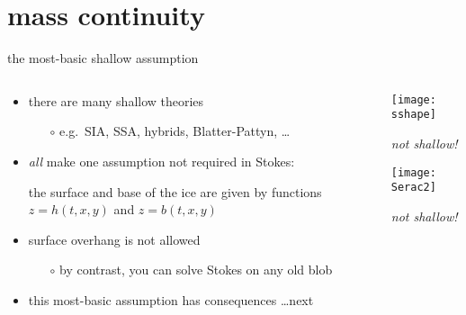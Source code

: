 
\section{mass continuity}

\begin{frame}{the most-basic shallow assumption}

\begin{columns}

\begin{column}{0.6\textwidth}
\begin{itemize}
\item there are many shallow theories
  \begin{itemize}
  \item[$\circ$] e.g.~SIA, SSA, hybrids, Blatter-Pattyn, \dots
  \end{itemize}
\item \emph{all} make one assumption not required in Stokes:

\begin{center}
\alert{the surface and base of the ice are given by functions $z=h(t,x,y)$ and $z=b(t,x,y)$}
\end{center}
\item surface overhang is not allowed
  \begin{itemize}
  \item[$\circ$] by contrast, you can solve Stokes on any old blob
  \end{itemize}
\item this most-basic assumption has consequences \dots next
\end{itemize}
\end{column}

\begin{column}{0.4\textwidth}
\texttt{[image: sshape]}

\scriptsize
\begin{center}
\emph{not shallow!}
\end{center}
\vspace{6mm}

\texttt{[image: Serac2]}

\begin{center}
\emph{not shallow!}
\end{center}
\end{column}
\end{columns}
\end{frame}


